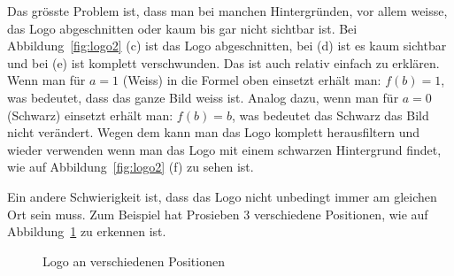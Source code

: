 \documentclass[12pt,a4paper]{report}
\begin{document}
Das grösste Problem ist, dass man bei manchen Hintergründen, vor allem weisse, das Logo abgeschnitten oder kaum bis gar nicht sichtbar ist.
Bei Abbildung~\ref{fig:logo2} (c) ist das Logo abgeschnitten, bei (d) ist es kaum sichtbar und bei (e) ist komplett verschwunden.
Das ist auch relativ einfach zu erklären.
Wenn man für $a = 1$ (Weiss) in die Formel oben einsetzt erhält man: $f(b) = 1$, was bedeutet, dass das ganze Bild weiss ist.
Analog dazu, wenn man für $a = 0$ (Schwarz) einsetzt erhält man: $f(b) = b$, was bedeutet das Schwarz das Bild nicht verändert.
Wegen dem kann man das Logo komplett herausfiltern und wieder verwenden wenn man das Logo mit einem schwarzen Hintergrund findet,
wie auf Abbildung~\ref{fig:logo2} (f) zu sehen ist.

Ein andere Schwierigkeit ist, dass das Logo nicht unbedingt immer am gleichen Ort sein muss.
Zum Beispiel hat Prosieben 3 verschiedene Positionen, wie auf Abbildung~\ref{fig:logo3} zu erkennen ist.
\begin{figure}[h]%
    \centering
    \qquad
    \qquad
    \caption{Logo an verschiedenen Positionen}%
    \label{fig:logo3}%
\end{figure}
\end{document}
